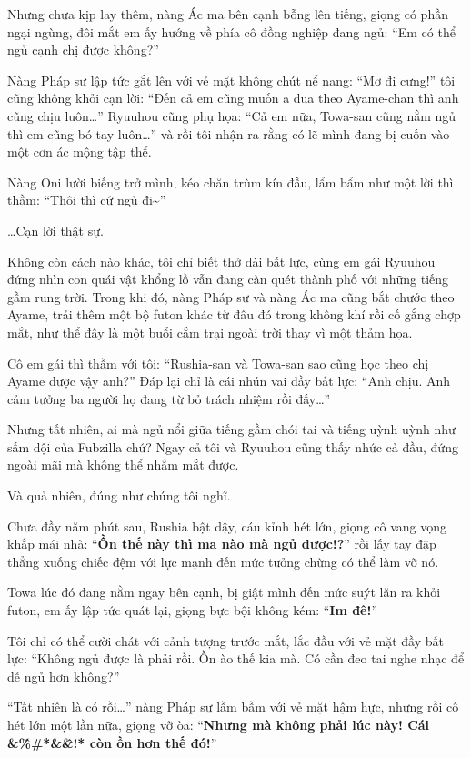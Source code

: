 \documentclass[../main.tex]{subfiles}
\begin{document}
Nhưng chưa kịp lay thêm, nàng Ác ma bên cạnh bỗng lên tiếng, giọng có phần ngại ngùng, đôi mắt em ấy hướng về phía cô đồng nghiệp đang ngủ: ``Em có thể ngủ cạnh chị được không?''

Nàng Pháp sư lập tức gắt lên với vẻ mặt không chút nể nang: ``Mơ đi cưng!'' tôi cũng không khỏi cạn lời: ``Đến cả em cũng muốn a dua theo Ayame-chan thì anh cũng chịu luôn\dots'' Ryuuhou cũng phụ họa: ``Cả em nữa, Towa-san cũng nằm ngủ thì em cũng bó tay luôn\dots'' và rồi tôi nhận ra rằng có lẽ mình đang bị cuốn vào một cơn ác mộng tập thể.

Nàng Oni lười biếng trở mình, kéo chăn trùm kín đầu, lẩm bẩm như một lời thì thầm: ``Thôi thì cứ ngủ đi\~{}''

\dots Cạn lời thật sự.

Không còn cách nào khác, tôi chỉ biết thở dài bất lực, cùng em gái Ryuuhou đứng nhìn con quái vật khổng lồ vẫn đang càn quét thành phố với những tiếng gầm rung trời. Trong khi đó, nàng Pháp sư và nàng Ác ma cũng bắt chước theo Ayame, trải thêm một bộ futon khác từ đâu đó trong không khí rồi cố gắng chợp mắt, như thể đây là một buổi cắm trại ngoài trời thay vì một thảm họa.

Cô em gái thì thầm với tôi: ``Rushia-san và Towa-san sao cũng học theo chị Ayame được vậy anh?'' Đáp lại chỉ là cái nhún vai đầy bất lực: ``Anh chịu. Anh cảm tưởng ba người họ đang từ bỏ trách nhiệm rồi đấy\dots''

Nhưng tất nhiên, ai mà ngủ nổi giữa tiếng gầm chói tai và tiếng uỳnh uỳnh như sấm dội của Fubzilla chứ? Ngay cả tôi và Ryuuhou cũng thấy nhức cả đầu, đứng ngoài mãi mà không thể nhắm mắt được.

\ct

Và quả nhiên, đúng như chúng tôi nghĩ.

Chưa đầy năm phút sau, Rushia bật dậy, cáu kỉnh hét lớn, giọng cô vang vọng khắp mái nhà: ``\textbf{Ồn thế này thì ma nào mà ngủ được!?}'' rồi lấy tay đập thẳng xuống chiếc đệm với lực mạnh đến mức tưởng chừng có thể làm vỡ nó.

Towa lúc đó đang nằm ngay bên cạnh, bị giật mình đến mức suýt lăn ra khỏi futon, em ấy lập tức quát lại, giọng bực bội không kém: ``\textbf{Im đê!}''


Tôi chỉ có thể cười chát với cảnh tượng trước mắt, lắc đầu với vẻ mặt đầy bất lực: ``Không ngủ được là phải rồi. Ồn ào thế kia mà. Có cần đeo tai nghe nhạc để dễ ngủ hơn không?''

``Tất nhiên là có rồi\dots'' nàng Pháp sư lầm bầm với vẻ mặt hậm hực, nhưng rồi cô hét lớn một lần nữa, giọng vỡ òa: ``\textbf{Nhưng mà không phải lúc này! Cái \&\^\%\#*\&\^\&!* còn ồn hơn thế đó!}''
\end{document}
